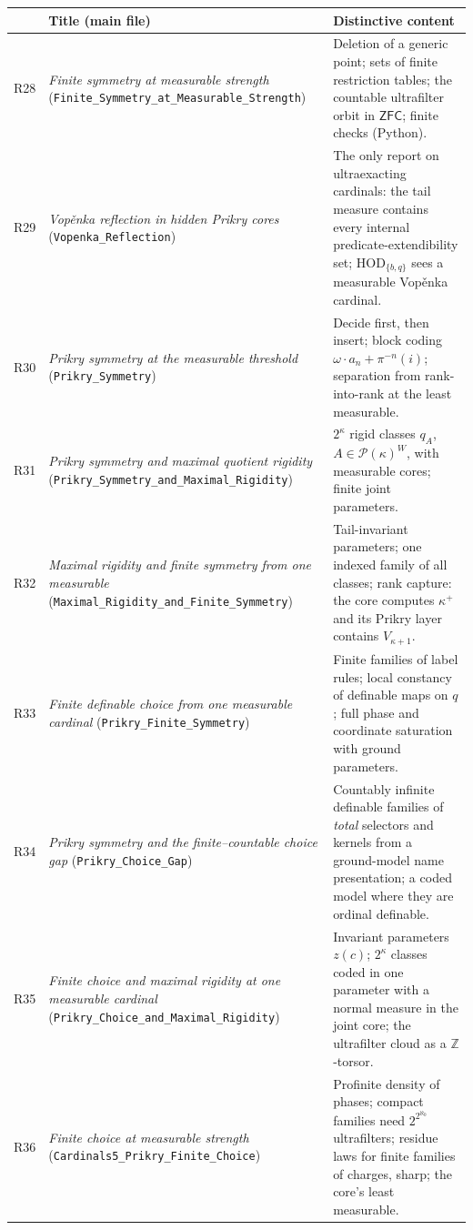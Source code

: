 \documentclass[11pt,letterpaper]{article}
\theoremstyle{definition}
\numberwithin{equation}{section}
\newcommand{\ZFC}{\mathsf{ZFC}}
\newcommand{\HOD}{\mathrm{HOD}}
\newcommand{\Pow}{\mathcal P}
\newcommand{\R}[1]{\textsf{R#1}}
\begin{document}
\begin{center}
\small
\renewcommand{\arraystretch}{1.18}
\begin{tabularx}{\textwidth}{@{}lP{.33\textwidth}Y@{}}
\toprule
&\textbf{Title (main file)}&\textbf{Distinctive content}\\\midrule
\R{28}&\emph{Finite symmetry at measurable strength} (\nolinkurl{Finite_Symmetry_at_Measurable_Strength})&Deletion of a generic point; sets of finite restriction tables; the countable ultrafilter orbit in $\ZFC$; finite checks (Python).\\
\R{29}&\emph{Vop\v enka reflection in hidden Prikry cores} (\nolinkurl{Vopenka_Reflection})&The only report on ultraexacting cardinals: the tail measure contains every internal predicate-extendibility set; $\HOD_{\{b,q\}}$ sees a measurable Vop\v enka cardinal.\\
\R{30}&\emph{Prikry symmetry at the measurable threshold} (\nolinkurl{Prikry_Symmetry})&Decide first, then insert; block coding $\omega\cdot a_n+\pi^{-n}(i)$; separation from rank-into-rank at the least measurable.\\
\R{31}&\emph{Prikry symmetry and maximal quotient rigidity} (\nolinkurl{Prikry_Symmetry_and_Maximal_Rigidity})&$2^\kappa$ rigid classes $q_A$, $A\in\Pow(\kappa)^W$, with measurable cores; finite joint parameters.\\
\R{32}&\emph{Maximal rigidity and finite symmetry from one measurable} (\nolinkurl{Maximal_Rigidity_and_Finite_Symmetry})&Tail-invariant parameters; one indexed family of all classes; rank capture: the core computes $\kappa^+$ and its Prikry layer contains $V_{\kappa+1}$.\\
\R{33}&\emph{Finite definable choice from one measurable cardinal} (\nolinkurl{Prikry_Finite_Symmetry})&Finite families of label rules; local constancy of definable maps on $q$; full phase and coordinate saturation with ground parameters.\\
\R{34}&\emph{Prikry symmetry and the finite--countable choice gap} (\nolinkurl{Prikry_Choice_Gap})&Countably infinite definable families of \emph{total} selectors and kernels from a ground-model name presentation; a coded model where they are ordinal definable.\\
\R{35}&\emph{Finite choice and maximal rigidity at one measurable cardinal} (\nolinkurl{Prikry_Choice_and_Maximal_Rigidity})&Invariant parameters $z(c)$; $2^\kappa$ classes coded in one parameter with a normal measure in the joint core; the ultrafilter cloud as a $\mathbb Z$-torsor.\\
\R{36}&\emph{Finite choice at measurable strength} (\nolinkurl{Cardinals5_Prikry_Finite_Choice})&Profinite density of phases; compact families need $2^{2^{\aleph_0}}$ ultrafilters; residue laws for finite families of charges, sharp; the core's least measurable.\\
\bottomrule
\end{tabularx}
\end{center}
\end{document}
